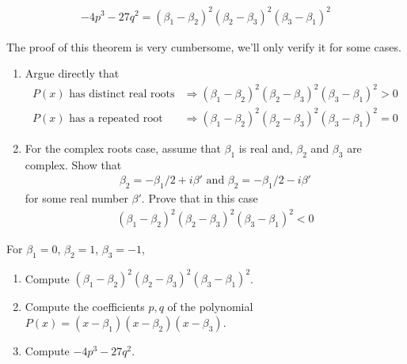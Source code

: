 \begin{thm}
\label{thm:discriminant}
	\begin{align*}
		-4p^3 - 27q^2 = (\beta_1 - \beta_2)^2(\beta_2 - \beta_3)^2(\beta_3 - \beta_1)^2 
	\end{align*}
\end{thm}
The proof of this theorem is very cumbersome, we'll only verify it for some cases.
\begin{questions}[resume]
	\item 
	\begin{enumerate}
		\item Argue directly that
		\begin{align*}
			P(x) \mbox{ has distinct real roots} & \Rightarrow  (\beta_1 - \beta_2)^2(\beta_2 - \beta_3)^2(\beta_3 - \beta_1)^2 > 0\\
			 P(x) \mbox{ has a repeated root}  & \Rightarrow  (\beta_1 - \beta_2)^2(\beta_2 - \beta_3)^2(\beta_3 - \beta_1)^2 = 0
		\end{align*}
	\item For the complex roots case, assume that $ \beta_1$ is real and, $ \beta_2 $ and $ \beta_3$ are complex. Show that 
		\begin{align*}
			\beta_2 = -\beta_1/2 + i \beta' \mbox{ and } \beta_2 = -\beta_1/2 - i \beta'
		\end{align*}
		for some real number $ \beta'$. Prove that in this case
		\begin{align*}
		  (\beta_1 - \beta_2)^2(\beta_2 - \beta_3)^2(\beta_3 - \beta_1)^2 < 0
		\end{align*}	
	\end{enumerate}
\end{questions}



\begin{questions}[resume]
	\item For $ \beta_1 = 0$, $\beta_2 = 1$, $\beta_3 = -1$,
	\begin{enumerate}
		\item Compute $(\beta_1 - \beta_2)^2(\beta_2 - \beta_3)^2(\beta_3 - \beta_1)^2$.
		\item Compute the coefficients $ p,q$ of the polynomial $ P(x) = (x - \beta_1)(x - \beta_2)(x - \beta_3)$. 
		\item Compute $-4p^3 - 27q^2$.
	\end{enumerate}
\end{questions}

